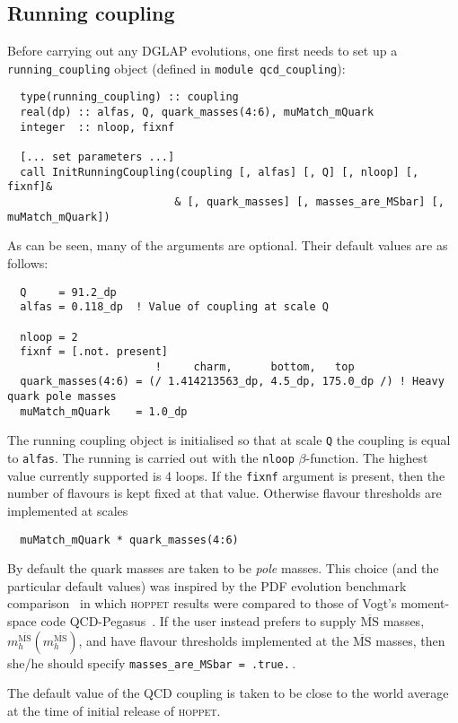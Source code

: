 \documentclass[12pt]{article}
\newcommand{\MSbar}{\overline{\mathrm{MS}}}
\newcommand{\hoppet}{\textsc{hoppet}\xspace}
\newcommand{\ttt}[1]{\texttt{#1}}
\begin{document}
\subsection{Running coupling}
\label{sec:run-coupl}

Before carrying out any DGLAP evolutions, one first needs to set up 
a \ttt{running\_coupling} object (defined in \ttt{module
  qcd\_coupling}):
\begin{lstlisting}
  type(running_coupling) :: coupling
  real(dp) :: alfas, Q, quark_masses(4:6), muMatch_mQuark
  integer  :: nloop, fixnf

  [... set parameters ...]
  call InitRunningCoupling(coupling [, alfas] [, Q] [, nloop] [, fixnf]&
                          & [, quark_masses] [, masses_are_MSbar] [, muMatch_mQuark])
\end{lstlisting}
As can be seen, many of the arguments are optional. Their default
values are as follows:
\begin{lstlisting}
  Q     = 91.2_dp
  alfas = 0.118_dp  ! Value of coupling at scale Q
 
  nloop = 2
  fixnf = [.not. present]
                       !     charm,      bottom,   top
  quark_masses(4:6) = (/ 1.414213563_dp, 4.5_dp, 175.0_dp /) ! Heavy quark pole masses
  muMatch_mQuark    = 1.0_dp
\end{lstlisting}
The running coupling object is initialised so that at scale \ttt{Q}
the coupling is equal to \ttt{alfas}. The running is carried out with
the \ttt{nloop} $\beta$-function. 
%
The highest value currently supported is 4 loops.
%
If the \ttt{fixnf} argument is
present, then the number of flavours is kept fixed at that
value. Otherwise flavour thresholds are implemented at scales
\begin{lstlisting}
  muMatch_mQuark * quark_masses(4:6)
\end{lstlisting}
By default the quark masses are taken to be \emph{pole} masses.
%
This choice (and the particular default values) was inspired by the
PDF evolution benchmark comparison~\cite{Giele:2002hx,Dittmar:2005ed} in which \hoppet
results were compared to those of Vogt's moment-space code
QCD-Pegasus~\cite{Pegasus}. 
%
If the user instead prefers to supply $\MSbar$ masses,
$m_h^{\MSbar}(m_h^{\MSbar})$, and have flavour thresholds implemented
at the $\MSbar$ masses, then she/he should specify
\ttt{masses\_are\_MSbar = .true.}\,.

The default value of the QCD coupling is
taken to be close to the world average at the time of initial release
of \hoppet \cite{Bethke:2006ac}.
%
\end{document}
